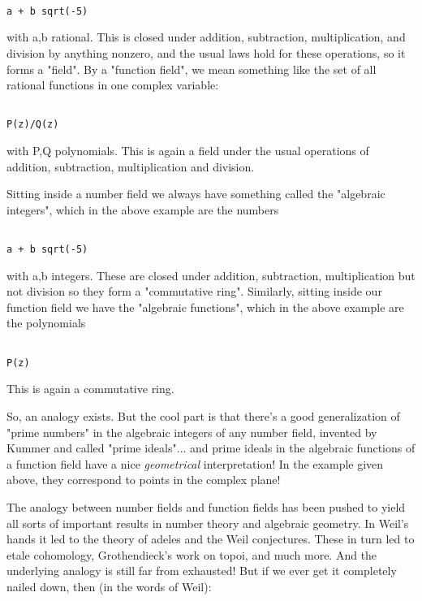 \begin{verbatim}

a + b sqrt(-5)
\end{verbatim}
    
with a,b rational.  This is closed under addition, subtraction,
multiplication, and division by anything nonzero, and the usual
laws hold for these operations, so it forms a "field".  By a
"function field", we mean something like the set of all rational
functions in one complex variable:


\begin{verbatim}

P(z)/Q(z)                    
\end{verbatim}
    
with P,Q polynomials.  This is again a field under the usual
operations of addition, subtraction, multiplication and division.

Sitting inside a number field we always have something called the 
"algebraic integers", which in the above example are the numbers


\begin{verbatim}

a + b sqrt(-5)
\end{verbatim}
    
with a,b integers.  These are closed under addition, subtraction,
multiplication but not division so they form a "commutative ring".
Similarly, sitting inside our function field we have the "algebraic 
functions", which in the above example are the polynomials


\begin{verbatim}

P(z)
\end{verbatim}
    
This is again a commutative ring.  

So, an analogy exists.  But the cool part is that there's a 
good generalization of "prime numbers" in the algebraic integers
of any number field, invented by Kummer and called "prime ideals"... 
and prime ideals in the algebraic functions of a function field 
have a nice \emph{geometrical} interpretation!  In the example given
above, they correspond to points in the complex plane!

The analogy between number fields and function fields has been 
pushed to yield all sorts of important results in number theory 
and algebraic geometry.  In Weil's hands it led to the theory of 
adeles and the Weil conjectures.  These in turn led to etale 
cohomology, Grothendieck's work on topoi, and much more.  And 
the underlying analogy is still far from exhausted!  But if we 
ever get it completely nailed down, then (in the words of Weil):

